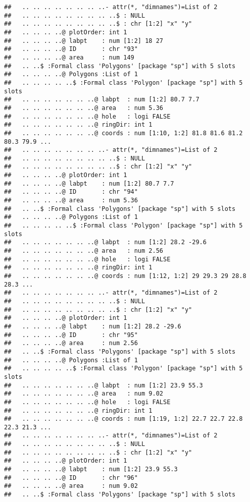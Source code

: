 \documentclass[]{article}
\begin{document}
\begin{verbatim}
##   .. .. .. .. .. .. .. ..- attr(*, "dimnames")=List of 2
##   .. .. .. .. .. .. .. .. ..$ : NULL
##   .. .. .. .. .. .. .. .. ..$ : chr [1:2] "x" "y"
##   .. .. .. ..@ plotOrder: int 1
##   .. .. .. ..@ labpt    : num [1:2] 18 27
##   .. .. .. ..@ ID       : chr "93"
##   .. .. .. ..@ area     : num 149
##   .. ..$ :Formal class 'Polygons' [package "sp"] with 5 slots
##   .. .. .. ..@ Polygons :List of 1
##   .. .. .. .. ..$ :Formal class 'Polygon' [package "sp"] with 5 slots
##   .. .. .. .. .. .. ..@ labpt  : num [1:2] 80.7 7.7
##   .. .. .. .. .. .. ..@ area   : num 5.36
##   .. .. .. .. .. .. ..@ hole   : logi FALSE
##   .. .. .. .. .. .. ..@ ringDir: int 1
##   .. .. .. .. .. .. ..@ coords : num [1:10, 1:2] 81.8 81.6 81.2 80.3 79.9 ...
##   .. .. .. .. .. .. .. ..- attr(*, "dimnames")=List of 2
##   .. .. .. .. .. .. .. .. ..$ : NULL
##   .. .. .. .. .. .. .. .. ..$ : chr [1:2] "x" "y"
##   .. .. .. ..@ plotOrder: int 1
##   .. .. .. ..@ labpt    : num [1:2] 80.7 7.7
##   .. .. .. ..@ ID       : chr "94"
##   .. .. .. ..@ area     : num 5.36
##   .. ..$ :Formal class 'Polygons' [package "sp"] with 5 slots
##   .. .. .. ..@ Polygons :List of 1
##   .. .. .. .. ..$ :Formal class 'Polygon' [package "sp"] with 5 slots
##   .. .. .. .. .. .. ..@ labpt  : num [1:2] 28.2 -29.6
##   .. .. .. .. .. .. ..@ area   : num 2.56
##   .. .. .. .. .. .. ..@ hole   : logi FALSE
##   .. .. .. .. .. .. ..@ ringDir: int 1
##   .. .. .. .. .. .. ..@ coords : num [1:12, 1:2] 29 29.3 29 28.8 28.3 ...
##   .. .. .. .. .. .. .. ..- attr(*, "dimnames")=List of 2
##   .. .. .. .. .. .. .. .. ..$ : NULL
##   .. .. .. .. .. .. .. .. ..$ : chr [1:2] "x" "y"
##   .. .. .. ..@ plotOrder: int 1
##   .. .. .. ..@ labpt    : num [1:2] 28.2 -29.6
##   .. .. .. ..@ ID       : chr "95"
##   .. .. .. ..@ area     : num 2.56
##   .. ..$ :Formal class 'Polygons' [package "sp"] with 5 slots
##   .. .. .. ..@ Polygons :List of 1
##   .. .. .. .. ..$ :Formal class 'Polygon' [package "sp"] with 5 slots
##   .. .. .. .. .. .. ..@ labpt  : num [1:2] 23.9 55.3
##   .. .. .. .. .. .. ..@ area   : num 9.02
##   .. .. .. .. .. .. ..@ hole   : logi FALSE
##   .. .. .. .. .. .. ..@ ringDir: int 1
##   .. .. .. .. .. .. ..@ coords : num [1:19, 1:2] 22.7 22.7 22.8 22.3 21.3 ...
##   .. .. .. .. .. .. .. ..- attr(*, "dimnames")=List of 2
##   .. .. .. .. .. .. .. .. ..$ : NULL
##   .. .. .. .. .. .. .. .. ..$ : chr [1:2] "x" "y"
##   .. .. .. ..@ plotOrder: int 1
##   .. .. .. ..@ labpt    : num [1:2] 23.9 55.3
##   .. .. .. ..@ ID       : chr "96"
##   .. .. .. ..@ area     : num 9.02
##   .. ..$ :Formal class 'Polygons' [package "sp"] with 5 slots

\end{verbatim}
\end{document}
